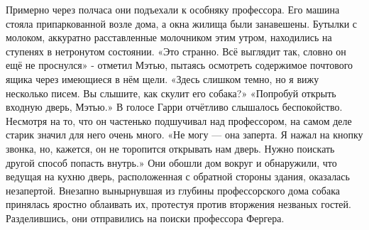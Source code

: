 \documentclass[a4paper,12pt]{book}
\begin{document}
	Примерно через полчаса они подъехали к особняку профессора. Его машина стояла припаркованной возле дома, а окна жилища были занавешены. Бутылки с молоком, аккуратно расставленные молочником этим утром, находились на ступенях в нетронутом состоянии.
	«Это странно. Всё выглядит так, словно он ещё не проснулся» - отметил Мэтью, пытаясь осмотреть содержимое почтового ящика через имеющиеся в нём щели.
	«Здесь слишком темно, но я вижу несколько писем. Вы слышите, как скулит его собака?»
	«Попробуй открыть входную дверь, Мэтью.»
	В голосе Гарри отчётливо слышалось беспокойство. Несмотря на то, что он частенько подшучивал над профессором, на самом деле старик значил для него очень много.
	«Не могу — она заперта. Я нажал на кнопку звонка, но, кажется, он не торопится открывать нам дверь. Нужно поискать другой способ попасть внутрь.»
	Они обошли дом вокруг и обнаружили, что ведущая на кухню дверь, расположенная с обратной стороны здания, оказалась незапертой. Внезапно вынырнувшая из глубины профессорского дома собака принялась яростно облаивать их, протестуя против вторжения незваных гостей.
	Разделившись, они отправились на поиски профессора Фергера.
\end{document}
